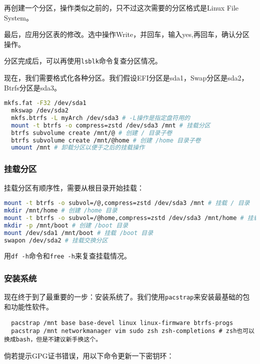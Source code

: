 再创建一个分区，操作类似之前的，只不过这次需要的分区格式是Linux File System。

最后，应用分区表的修改。选中操作Write，并回车，输入yes,再回车，确认分区操作。

分区完成后，可以再使用\texttt{lsblk}命令复查分区情况。

现在，我们需要格式化各种分区。我们假设EFI分区是sda1，Swap分区是sda2，Btrfs分区是sda3。

\begin{lstlisting}[language=bash]
  mkfs.fat -F32 /dev/sda1
  mkswap /dev/sda2
  mkfs.btrfs -L myArch /dev/sda3 # -L操作是指定盘符用的
  mount -t btrfs -o compress=zstd /dev/sda3 /mnt # 挂载分区
  btrfs subvolume create /mnt/@ # 创建 / 目录子卷
  btrfs subvolume create /mnt/@home # 创建 /home 目录子卷
  umount /mnt # 卸载分区以便于之后的挂载操作
\end{lstlisting}

\subsubsection{挂载分区}

挂载分区有顺序性，需要从根目录开始挂载：

\begin{lstlisting}[language=bash]
mount -t btrfs -o subvol=/@,compress=zstd /dev/sda3 /mnt # 挂载 / 目录
mkdir /mnt/home # 创建 /home 目录
mount -t btrfs -o subvol=/@home,compress=zstd /dev/sda3 /mnt/home # 挂载 /home 目录
mkdir -p /mnt/boot # 创建 /boot 目录
mount /dev/sda1 /mnt/boot # 挂载 /boot 目录
swapon /dev/sda2 # 挂载交换分区
\end{lstlisting}

用\texttt{df -h}命令和\texttt{free -h}来复查挂载情况。

\subsubsection{安装系统}

现在终于到了最重要的一步：安装系统了。我们使用\texttt{pacstrap}来安装最基础的包和功能性软件。

\begin{lstlisting}
  pacstrap /mnt base base-devel linux linux-firmware btrfs-progs
  pacstrap /mnt networkmanager vim sudo zsh zsh-completions # zsh也可以换成bash，但是不建议新手换这个。
\end{lstlisting}

倘若提示GPG证书错误，用以下命令更新一下密钥环：

